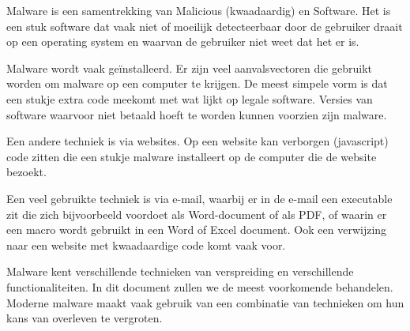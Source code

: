 Malware is een samentrekking van Malicious (kwaadaardig) en Software. Het is een stuk software dat vaak niet of moeilijk detecteerbaar door de gebruiker draait op een operating system en waarvan de gebruiker niet weet dat het er is.

Malware wordt vaak  ge\"installeerd. Er zijn veel aanvalsvectoren die gebruikt worden om malware op een computer te krijgen. De meest simpele vorm is dat een stukje extra code meekomt met wat lijkt op legale software. Versies van software waarvoor niet betaald hoeft te worden kunnen voorzien zijn malware.

Een andere techniek is via websites. Op een website kan verborgen (javascript) code zitten die een stukje malware installeert op de computer die de website bezoekt.

Een veel gebruikte techniek is via e-mail, waarbij er in de e-mail een executable zit die zich bijvoorbeeld voordoet als Word-document of als PDF, of waarin er een macro wordt gebruikt in een Word of Excel document. Ook een verwijzing naar een website met kwaadaardige code komt vaak voor.

Malware kent verschillende technieken van verspreiding en verschillende functionaliteiten. In dit document zullen we de meest voorkomende behandelen. Moderne malware maakt vaak gebruik van een combinatie van technieken om hun kans van overleven te vergroten.


